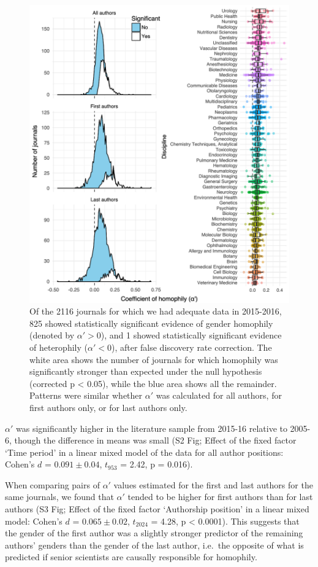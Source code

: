 \documentclass[12pt,]{article}
\begin{document}
\begin{figure}[htbp]
\centering
\includegraphics{../figures/Fig2.pdf}
\caption{Of the 2116 journals for which we had adequate data in
2015-2016, 825 showed statistically significant evidence of gender
homophily (denoted by \(\alpha' > 0\)), and 1 showed statistically
significant evidence of heterophily (\(\alpha' < 0\)), after false
discovery rate correction. The white area shows the number of journals
for which homophily was significantly stronger than expected under the
null hypothesis (corrected p \textless{} 0.05), while the blue area
shows all the remainder. Patterns were similar whether \(\alpha'\) was
calculated for all authors, for first authors only, or for last authors
only. \label{alpha_histograms}}
\end{figure}

\(\alpha'\) was significantly higher in the literature sample from
2015-16 relative to 2005-6, though the difference in means was small (S2
Fig; Effect of the fixed factor `Time period' in a linear mixed model of
the data for all author positions: Cohen's \(d\) = \(0.091{\pm}0.04\),
\(t_{953}\) = 2.42, p = 0.016).

When comparing pairs of \(\alpha'\) values estimated for the first and
last authors for the same journals, we found that \(\alpha'\) tended to
be higher for first authors than for last authors (S3 Fig; Effect of the
fixed factor `Authorship position' in a linear mixed model: Cohen's
\(d\) = \(0.065{\pm}0.02\), \(t_{2024}\) = 4.28, p \textless{} 0.0001).
This suggests that the gender of the first author was a slightly
stronger predictor of the remaining authors' genders than the gender of
the last author, i.e.~the opposite of what is predicted if senior
scientists are causally responsible for homophily.
\end{document}
